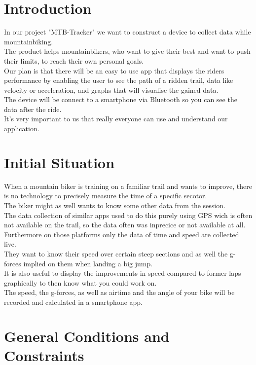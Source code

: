 \documentclass[12pt]{article}
\theoremstyle{definition}
\begin{document}
\section{Introduction}
In our project "MTB-Tracker" we want to construct a device to collect data while mountainbiking.\\
The product helps mountainbikers, who want to give their best and want to push their limits, to reach their own personal goals.\\
Our plan is that there will be an easy to use app that displays the riders performance by enabling the user to see the path of a ridden trail, data like velocity or acceleration, and graphs that will visualise the gained data.\\
The device will be connect to a smartphone via Bluetooth so you can see the data after the ride.\\
It's very important to us that really everyone can use and understand our application.\\
\pagebreak

\section{Initial Situation}
When a mountain biker is training on a familiar trail and wants to improve, there is no technology to precisely measure the time of a specific secotor.\\
The biker might as well wants to know some other data from the session.\\
The data collection of similar apps used to do this purely using GPS wich is often not available on the trail, so the data often was inprecice or not available at all.\\
Furthermore on those platforms only the data of time and speed are collected live.\\
They want to know their speed over certain steep sections and as well the g-forces implied on them when landing a big jump.\\
It is also useful to display the improvements in speed compared to former laps graphically to then know what you could work on. \\
The speed, the g-forces, as well as airtime and the angle of your bike will be recorded and calculated in a smartphone app.
\pagebreak

\section{General Conditions and Constraints}
\end{document}

